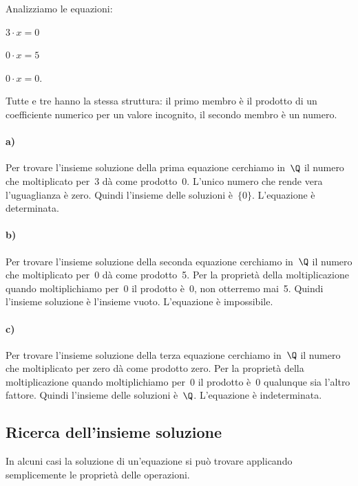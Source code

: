  \begin{esempio}{}{}
 Analizziamo le equazioni:
\begin{htmulticols}{3}
 \begin{enumeratea}
 \item \(3\cdot x=0\)
 \item \(0\cdot x=5\)
 \item \(0\cdot x=0\).
\end{enumeratea}
\end{htmulticols}

Tutte e tre hanno la stessa struttura: il primo membro è il prodotto
di un coefficiente numerico per un valore incognito, il secondo membro
è un numero.

\paragraph{a)} Per trovare l'insieme soluzione della prima equazione 
cerchiamo 
in~\(\Q\) il
numero che moltiplicato per~3 dà come prodotto~0. L'unico numero che rende 
vera
l'uguaglianza è zero. Quindi l'insieme delle soluzioni è~\(\{0\}\). 
L'equazione 
è
determinata.

\paragraph{b)} Per trovare l'insieme soluzione della seconda equazione 
cerchiamo 
in~\(\Q\) il
numero che moltiplicato per~0 dà come prodotto~5. Per la proprietà
della moltiplicazione quando moltiplichiamo per~0 il prodotto è~0,
non otterremo mai~5. Quindi l'insieme soluzione è
l'insieme vuoto. L'equazione è
impossibile.

\paragraph{c)} Per trovare l'insieme soluzione della terza equazione 
cerchiamo 
in~\(\Q\) il
numero che moltiplicato per zero dà come prodotto zero. Per la
proprietà della moltiplicazione quando moltiplichiamo per~0 il
prodotto è~0 qualunque sia l'altro fattore. Quindi
l'insieme delle soluzioni è~\(\Q\). L'equazione è
indeterminata.
 \end{esempio}

\subsection{Ricerca dell'insieme soluzione}
In alcuni casi la soluzione di un'equazione si può
trovare applicando semplicemente le proprietà delle operazioni.

